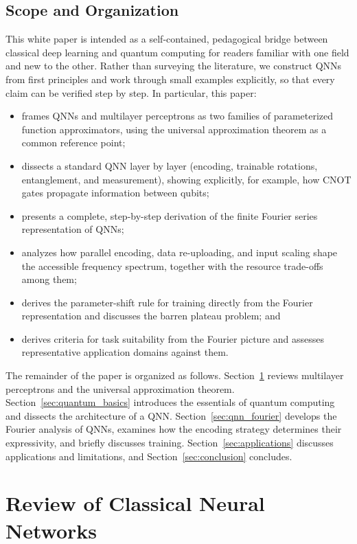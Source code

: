 \documentclass[12pt]{article}
\numberwithin{equation}{section}  %
\begin{document}
\subsection{Scope and Organization}
\label{sec:intro_organization}

This white paper is intended as a self-contained, pedagogical bridge between classical deep learning and quantum computing for readers familiar with one field and new to the other. Rather than surveying the literature, we construct QNNs from first principles and work through small examples explicitly, so that every claim can be verified step by step. In particular, this paper:
\begin{itemize}
\item frames QNNs and multilayer perceptrons as two families of parameterized function approximators, using the universal approximation theorem as a common reference point;
\item dissects a standard QNN layer by layer (encoding, trainable rotations, entanglement, and measurement), showing explicitly, for example, how CNOT gates propagate information between qubits;
\item presents a complete, step-by-step derivation of the finite Fourier series representation of QNNs;
\item analyzes how parallel encoding, data re-uploading, and input scaling shape the accessible frequency spectrum, together with the resource trade-offs among them;
\item derives the parameter-shift rule for training directly from the Fourier representation and discusses the barren plateau problem; and
\item derives criteria for task suitability from the Fourier picture and assesses representative application domains against them.
\end{itemize}

The remainder of the paper is organized as follows. Section~\ref{sec:classical_nn} reviews multilayer perceptrons and the universal approximation theorem. Section~\ref{sec:quantum_basics} introduces the essentials of quantum computing and dissects the architecture of a QNN. Section~\ref{sec:qnn_fourier} develops the Fourier analysis of QNNs, examines how the encoding strategy determines their expressivity, and briefly discusses training. Section~\ref{sec:applications} discusses applications and limitations, and Section~\ref{sec:conclusion} concludes.

\section{Review of Classical Neural Networks}
\label{sec:classical_nn}
\end{document}
